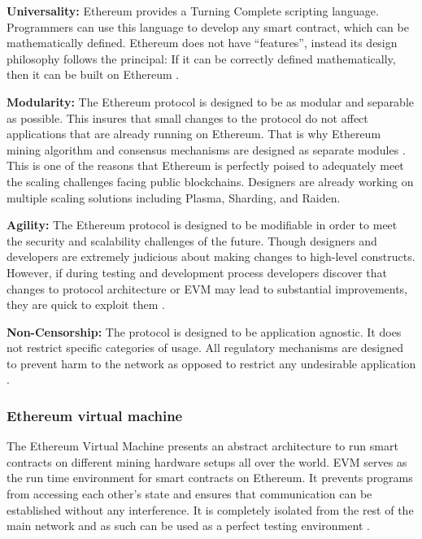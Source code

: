 \textbf{Universality:} Ethereum provides a Turning Complete scripting language.  Programmers can use this language to develop any smart contract, which can be mathematically defined.  Ethereum does not have “features”, instead its design philosophy follows the principal: If it can be correctly defined mathematically, then it can be built on Ethereum \cite{eth:001}. 

\textbf{Modularity:} The Ethereum protocol is designed to be as modular and separable as possible. This insures that small changes to the protocol do not affect applications that are already running on Ethereum. That is why Ethereum mining algorithm and consensus mechanisms are designed as separate modules \cite{eth:001}. This is one of the reasons that Ethereum is perfectly poised to adequately meet the scaling challenges facing public blockchains. Designers are already working on multiple scaling solutions including Plasma, Sharding, and Raiden.

\textbf{Agility:} The Ethereum protocol is designed to be modifiable in order to meet the security and scalability challenges of the future. Though designers and developers are extremely judicious about making changes to high-level constructs. However, if during testing and development process developers discover that changes to protocol architecture or EVM may lead to substantial improvements, they are quick to exploit them \cite{eth:001}. 

\textbf{Non-Censorship:} The protocol is designed to be application agnostic. It does not restrict specific categories of usage. All regulatory mechanisms are designed to prevent harm to the network as opposed to restrict any undesirable application \cite{eth:001}.



\subsubsection{Ethereum virtual machine}
The Ethereum Virtual Machine presents an abstract architecture to run smart contracts on different mining hardware setups all over the world. EVM serves as the run time environment for smart contracts on Ethereum. It prevents programs from accessing each other’s state and ensures that communication can be established without any interference. It is completely isolated from the rest of the main network and as such can be used as a perfect testing environment \cite{misc:023}.


